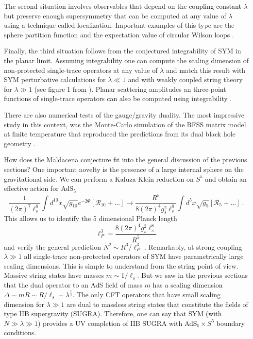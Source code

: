 \documentclass{ws-rv9x6}
\newcommand\be{\begin{equation}}
\newcommand\ee{\end{equation}}
\begin{document}
The second situation involves observables that depend on the coupling
constant $\lambda$ but preserve enough supersymmetry that can be
computed at any value of $\lambda$ using a technique called localization.
Important examples of this type are the sphere partition function
and the expectation value of circular Wilson loops \cite{arXiv:0712.2824 , hep-th/0003055}.

Finally, the third situation follows from the conjectured integrability
of SYM in the planar limit. Assuming integrability one can compute
the scaling dimension of non-protected single-trace operators at any
value of $\lambda$ and match this result with SYM perturbative calculations
for $\lambda\ll1$ and with weakly coupled string theory for $\lambda\gg1$
(see figure 1 from \cite{arXiv:0906.4240}). Planar scattering amplitudes
an three-point functions of single-trace operators can also be computed
using integrability \cite{arXiv:1303.1396, arXiv:1505.06745}.

There are also numerical tests of the gauge/gravity duality. 
The most impressive study in this context, was the Monte-Carlo simulation  
of the BFSS matrix model \cite{hep-th/9610043} at finite temperature that reproduced the predictions from its dual 
black hole geometry \cite{arXiv:0706.3518, arXiv:0707.4454, arXiv:0803.4273, arXiv:0811.3102, arXiv:0909.4947, arXiv:1108.5153, arXiv:1311.5607}. 

How does the Maldacena conjecture fit into the general discussion
of the previous sections? One important novelty is the presence of
a large internal sphere on the gravitational side. We can perform
a Kaluza-Klein reduction on $S^{5}$ and obtain an effective action
for AdS$_{5}$
\be
\frac{1}{(2\pi)^{7}\ell_{s}^{8}}\int d^{10}x\sqrt{g_{10}}e^{-2\Phi}\left[\mathcal{R}_{10}+\dots\right]\to\frac{R^{5}}{8(2\pi)^{4}g_{s}^{2}\ell_{s}^{8}}\int d^{5}x\sqrt{g_{5}}\left[\mathcal{R}_{5}+\dots\right]\ .
\nonumber
\ee
This allows us to identify the 5 dimensional Planck length 
\be
\ell_{P}^{3}=\frac{8(2\pi)^{4}g_{s}^{2}\ell_{s}^{8}}{R^{5}}
\ee
and verify the general prediction $N^{2}\sim R^{3}/\ell_{P}^{3}$
. Remarkably, at strong coupling $\lambda\gg1$ all single-trace non-protected
operators of SYM have parametrically large scaling dimensions. This
is simple to understand from the string point of view. Massive string
states have masses $m\sim1/\ell_{s}$. But we saw in the previous
sections that the dual operator to an AdS field of mass $m$ has a
scaling dimension $\Delta\sim mR\sim R/\ell_{s} \sim\lambda^{\frac{1}{4}}$. The only
CFT operators that have small scaling dimension for $\lambda\gg1$
are dual to massless string states that constitute the fields of type
IIB supergravity (SUGRA). Therefore, one can say that SYM (with $N\gg\lambda\gg1$)
provides a UV completion of IIB SUGRA with AdS$_{5}\times S^{5}$
boundary conditions. 
\end{document}
